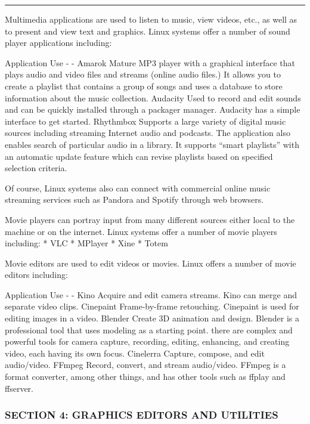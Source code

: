 \begin{center}\rule{3in}{0.4pt}\end{center}

Multimedia applications are used to listen to music, view videos, etc.,
as well as to present and view text and graphics. Linux systems offer a
number of sound player applications including:

Application \textbar{} Use - \textbar{} - Amarok \textbar{} Mature MP3
player with a graphical interface that plays audio and video files and
streams (online audio files.) It allows you to create a playlist that
contains a group of songs and uses a database to store information about
the music collection. Audacity \textbar{} Used to record and edit sounds
and can be quickly installed through a packager manager. Audacity has a
simple interface to get started. Rhythmbox \textbar{} Supports a large
variety of digital music sources including streaming Internet audio and
podcasts. The application also enables search of particular audio in a
library. It supports ``smart playlists'' with an automatic update
feature which can revise playlists based on specified selection
criteria.

Of course, Linux systems also can connect with commercial online music
streaming services such as Pandora and Spotify through web browsers.

Movie players can portray input from many different sources either local
to the machine or on the internet. Linux systems offer a number of movie
players including: * VLC * MPlayer * Xine * Totem

Movie editors are used to edit videos or movies. Linux offers a number
of movie editors including:

Application \textbar{} Use - \textbar{} - Kino \textbar{} Acquire and
edit camera streams. Kino can merge and separate video clips. Cinepaint
\textbar{} Frame-by-frame retouching. Cinepaint is used for editing
images in a video. Blender \textbar{} Create 3D animation and design.
Blender is a professional tool that uses modeling as a starting point.
there are complex and powerful tools for camera capture, recording,
editing, enhancing, and creating video, each having its own focus.
Cinelerra \textbar{} Capture, compose, and edit audio/video. FFmpeg
\textbar{} Record, convert, and stream audio/video. FFmpeg is a format
converter, among other things, and has other tools such as ffplay and
ffserver.

\subsubsection{SECTION 4: GRAPHICS EDITORS AND
UTILITIES}\label{section-4-graphics-editors-and-utilities}

